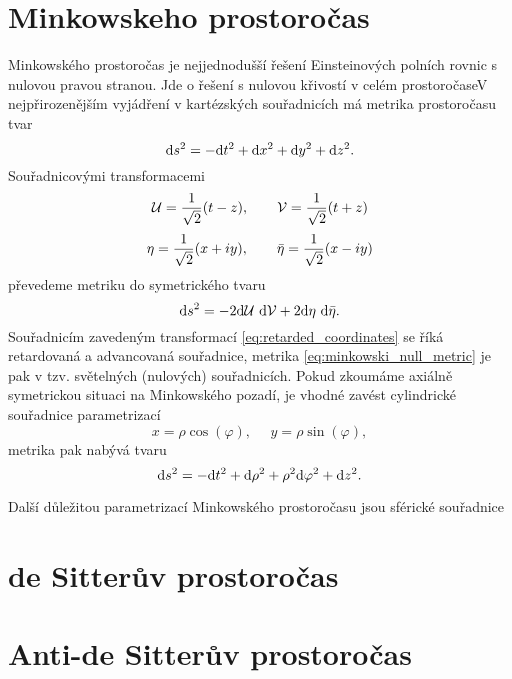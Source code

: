 \section{Minkowskeho prostoročas}
Minkowského prostoročas je nejjednodušší řešení Einsteinových polních rovnic s nulovou pravou stranou.
Jde o řešení s nulovou křivostí v celém prostoročaseV
nejpřirozenějším vyjádření v kartézských souřadnicích má metrika prostoročasu tvar
\begin{equation}
     \label{eq:minkowski}
     \mathrm{d} s^2 = - \mathrm{d} t^2 + \mathrm{d} x^2 + \mathrm{d} y^2 + \mathrm{d} z^2.
\end{equation}
Souřadnicovými transformacemi
\begin{equation}
     \label{eq:retarded_coordinates}
     \mathcal{U} = \frac{1}{\sqrt{2}} (t - z),~~~~~~\mathcal{V} = \frac{1}{\sqrt{2}} (t + z)
\end{equation}
\begin{equation}
     \eta = \frac{1}{\sqrt{2}} (x + iy), ~~~~~~\bar{\eta} = \frac{1}{\sqrt{2}} (x - iy)
\end{equation}
převedeme metriku do symetrického tvaru
\begin{equation}
     \label{eq:minkowski_null_metric}
     \mathrm{d} s^2 = -2 \mathrm{d} \mathcal{U} ~ \mathrm{d} \mathcal{V} + 2 \mathrm{d} \eta ~ \mathrm{d} \bar{\eta}.
\end{equation}
Souřadnicím zavedeným transformací \ref{eq:retarded_coordinates} se říká retardovaná a advancovaná souřadnice,
metrika \ref{eq:minkowski_null_metric} je pak v tzv. světelných (nulových) souřadnicích.
Pokud zkoumáme axiálně symetrickou situaci na Minkowského pozadí, je vhodné zavést cylindrické
souřadnice parametrizací
\begin{equation}
     x = \rho \cos (\varphi), ~~~~~~ y = \rho \sin (\varphi),
\end{equation}
metrika pak nabývá tvaru
\begin{equation}
     \mathrm{d} s^2 = -\mathrm{d} t^2 + \mathrm{d} \rho^2 + \rho^2 \mathrm{d} \varphi^2 + \mathrm{d} z^2.
\end{equation}

Další důležitou parametrizací Minkowského prostoročasu jsou sférické souřadnice



\section{de Sitterův prostoročas}



\section{Anti-de Sitterův prostoročas}


